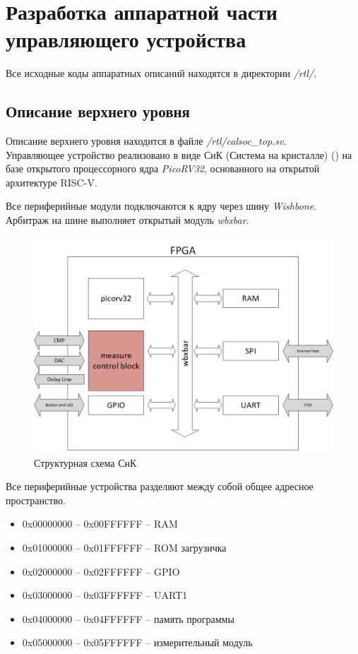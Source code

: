 \chapter{Разработка аппаратной части управляющего устройства}

Все исходные коды аппаратных описаний находятся в директории \emph{/rtl/}.

\section{Описание верхнего уровня}

Описание верхнего уровня находится в файле \emph{/rtl/calsoc\_top.sv}.\\

Управляющее устройство реализовано в виде СнК (Система на кристалле) () на базе открытого процессорного
ядра \emph{PicoRV32}, основанного на открытой архитектуре RISC-V.

Все периферийные модули подключаются к ядру через шину \emph{Wishbone}. Арбитраж на шине выполняет открытый модуль
\emph{wbxbar}.

\begin{figure}[ht!] 
	\center
	\includegraphics [scale=0.7] {my_folder/images//calsoc}
	\caption{Структурная схема СнК} 
	\label{fig:calsoc}  
\end{figure}

Все периферийные устройства разделяют между собой общее адресное пространство.

\begin{itemize}[label={}]
	\item 0x00000000 -- 0x00FFFFFF -- RAM 
	\item 0x01000000 -- 0x01FFFFFF -- ROM загрузичка
	\item 0x02000000 -- 0x02FFFFFF -- GPIO
	\item 0x03000000 -- 0x03FFFFFF -- UART1
	\item 0x04000000 -- 0x04FFFFFF -- память программы
	\item 0x05000000 -- 0x05FFFFFF -- измерительный модуль
\end{itemize}


